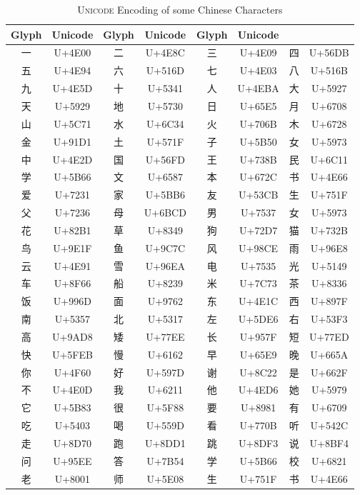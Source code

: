 \begin{CJK}{UTF8}{gbsn} %

\begin{table}[!th]
    \centering
    \begin{tabular}{|c|c|c|c|c|c|c|c|}
    \hline
    \textbf{Glyph} & \textbf{Unicode} & \textbf{Glyph} & \textbf{Unicode} & \textbf{Glyph} & \textbf{Unicode} \\
      \hline
    一 & U+4E00 & 二 & U+4E8C & 三 & U+4E09 & 四 & U+56DB \\
    五 & U+4E94 & 六 & U+516D & 七 & U+4E03 & 八 & U+516B \\
    九 & U+4E5D & 十 & U+5341 & 人 & U+4EBA & 大 & U+5927 \\
    天 & U+5929 & 地 & U+5730 & 日 & U+65E5 & 月 & U+6708 \\
    山 & U+5C71 & 水 & U+6C34 & 火 & U+706B & 木 & U+6728 \\
    金 & U+91D1 & 土 & U+571F & 子 & U+5B50 & 女 & U+5973 \\
    中 & U+4E2D & 国 & U+56FD & 王 & U+738B & 民 & U+6C11 \\
    学 & U+5B66 & 文 & U+6587 & 本 & U+672C & 书 & U+4E66 \\
    爱 & U+7231 & 家 & U+5BB6 & 友 & U+53CB & 生 & U+751F \\
    父 & U+7236 & 母 & U+6BCD & 男 & U+7537 & 女 & U+5973 \\
    花 & U+82B1 & 草 & U+8349 & 狗 & U+72D7 & 猫 & U+732B \\
    鸟 & U+9E1F & 鱼 & U+9C7C & 风 & U+98CE & 雨 & U+96E8 \\
    云 & U+4E91 & 雪 & U+96EA & 电 & U+7535 & 光 & U+5149 \\
    车 & U+8F66 & 船 & U+8239 & 米 & U+7C73 & 茶 & U+8336 \\
    饭 & U+996D & 面 & U+9762 & 东 & U+4E1C & 西 & U+897F \\
    南 & U+5357 & 北 & U+5317 & 左 & U+5DE6 & 右 & U+53F3 \\
    高 & U+9AD8 & 矮 & U+77EE & 长 & U+957F & 短 & U+77ED \\
    快 & U+5FEB & 慢 & U+6162 & 早 & U+65E9 & 晚 & U+665A \\
    你 & U+4F60 & 好 & U+597D & 谢 & U+8C22 & 是 & U+662F \\
    不 & U+4E0D & 我 & U+6211 & 他 & U+4ED6 & 她 & U+5979 \\
    它 & U+5B83 & 很 & U+5F88 & 要 & U+8981 & 有 & U+6709 \\
    吃 & U+5403 & 喝 & U+559D & 看 & U+770B & 听 & U+542C \\
    走 & U+8D70 & 跑 & U+8DD1 & 跳 & U+8DF3 & 说 & U+8BF4 \\
    问 & U+95EE & 答 & U+7B54 & 学 & U+5B66 & 校 & U+6821 \\
    老 & U+8001 & 师 & U+5E08 & 生 & U+751F & 书 & U+4E66 \\
    \hline
    \end{tabular}
    \caption{\textsc{Unicode} Encoding of some Chinese Characters}
    \label{tab:chinese_table}
\end{table}
\end{CJK}

